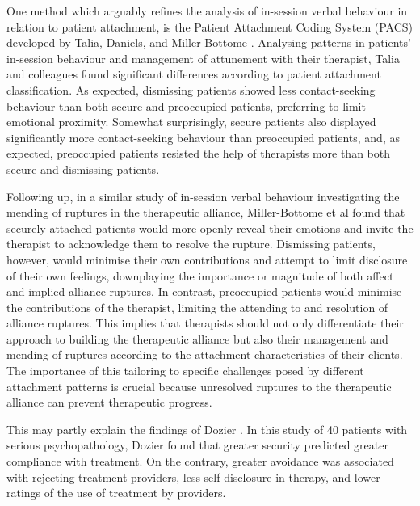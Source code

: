 \documentclass[12pt]{report}
\begin{document}
One method which arguably refines the analysis of in-session verbal behaviour in relation to patient attachment, is the Patient Attachment Coding System (PACS) developed by Talia, Daniels, and Miller-Bottome \cite{Talia2014, Talia2017}.
Analysing patterns in patients' in-session behaviour and management of attunement with their therapist, Talia and colleagues \cite{Talia2014} found significant differences according to patient attachment classification.
As expected, dismissing patients showed less contact-seeking behaviour than both secure and preoccupied patients, preferring to limit emotional proximity.
Somewhat surprisingly, secure patients also displayed significantly more contact-seeking behaviour than preoccupied patients, and, as expected, preoccupied patients resisted the help of therapists more than both secure and dismissing patients.

Following up, in a similar study of in-session verbal behaviour investigating the mending of ruptures in the therapeutic alliance, Miller-Bottome et al \cite{MillerBottome2018} found that securely attached patients would more openly reveal their emotions and invite the therapist to acknowledge them to resolve the rupture.
Dismissing patients, however, would minimise their own contributions and attempt to limit disclosure of their own feelings, downplaying the importance or magnitude of both affect and implied alliance ruptures.
In contrast, preoccupied patients would minimise the contributions of the therapist, limiting the attending to and resolution of alliance ruptures.
This implies that therapists should not only differentiate their approach to building the therapeutic alliance but also their management and mending of ruptures according to the attachment characteristics of their clients. The importance of this tailoring to specific challenges posed by different attachment patterns is crucial because unresolved ruptures to the therapeutic alliance can prevent therapeutic progress.

This may partly explain the findings of Dozier \cite{Dozier1990}.
In this study of 40 patients with serious psychopathology, Dozier found that greater security predicted greater compliance with treatment.
On the contrary, greater avoidance was associated with rejecting treatment providers, less self-disclosure in therapy, and lower ratings of the use of treatment by providers.
\end{document}
